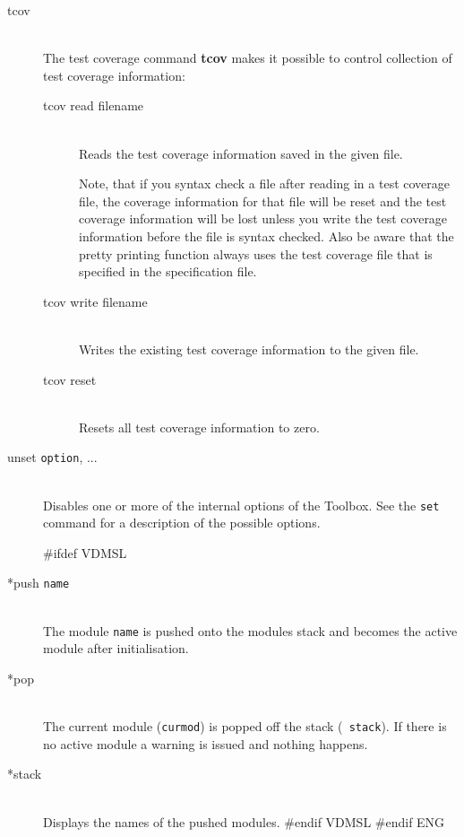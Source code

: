 \documentclass[\pformat,12pt]{article}
\newcommand{\Toolbox}{Toolbox}
\newcommand{\Toolbox}{Toolbox}
\begin{document}
\begin{description}
\item[tcov]\mbox{}\\
The test coverage command {\bf tcov} makes it possible to control 
collection of test coverage information:

  \begin{description}
  \item[tcov read filename]\mbox{}\\
    Reads the test coverage information saved in the given file.

    Note, that if you syntax check a file after reading in a test coverage 
    file, the coverage information for that file will be reset and the test coverage
    information will be lost unless you write the test coverage information
    before the file is syntax checked.
    Also be aware that the pretty printing function always uses the test coverage
    file that is specified in the specification file.

  \item[tcov write filename]\mbox{} \\
    Writes the existing test coverage information to the given file.
  
  \item[tcov reset]\mbox{} \\
    Resets all test coverage information to zero.
  \end{description}

  
\item[unset {\tt option}, ...]\mbox{}\\
  Disables one or more of the internal options of the \Toolbox. See the
  {\tt set} command for a description of the possible options.

#ifdef VDMSL
\item[*push {\tt name}] \mbox{}\\
  The module {\tt name}\/ is pushed onto the modules stack and becomes
  the active module after initialisation.

\item[*pop] \mbox{}\\
  The current module ({\tt curmod}) is popped off the stack ({\tt
    stack}). If there is no active module a warning is issued and
  nothing happens.

\item[*stack]\mbox{}\\
  Displays the names of the pushed modules.
#endif VDMSL
#endif ENG


\end{description}
\end{document}
